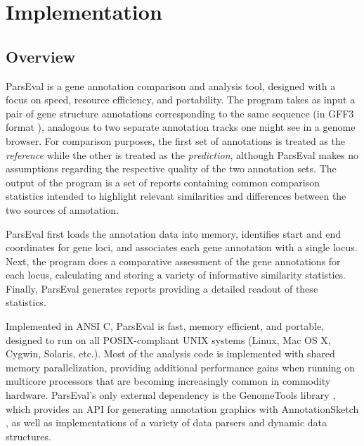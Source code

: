 \section{Implementation}

\subsection{Overview}
ParsEval is a gene annotation comparison and analysis tool, designed with a focus on speed, resource efficiency, and portability.
The program takes as input a pair of gene structure annotations corresponding to the same sequence (in GFF3 format \citep{SO}), analogous to two separate annotation tracks one might see in a genome browser.
For comparison purposes, the first set of annotations is treated as the \emph{reference} while the other is treated as the \emph{prediction}, although ParsEval makes no assumptions regarding the respective quality of the two annotation sets.
The output of the program is a set of reports containing common comparison statistics intended to highlight relevant similarities and differences between the two sources of annotation.

ParsEval first loads the annotation data into memory, identifies start and end coordinates for gene loci, and associates each gene annotation with a single locus.
Next, the program does a comparative assessment of the gene annotations for each locus, calculating and storing a variety of informative similarity statistics.
Finally, ParsEval generates reports providing a detailed readout of these statistics.

Implemented in ANSI C, ParsEval is fast, memory efficient, and portable, designed to run on all POSIX-compliant UNIX systems (Linux, Mac OS X, Cygwin, Solaris, etc.).
Most of the analysis code is implemented with shared memory parallelization, providing additional performance gains when running on multicore processors that are becoming increasingly common in commodity hardware.
ParsEval's only external dependency is the GenomeTools library \citep{GenomeToolsWebsite}, which provides an API for generating annotation graphics with AnnotationSketch \citep{Steinbiss}, as well as implementations of a variety of data parsers and dynamic data structures.

